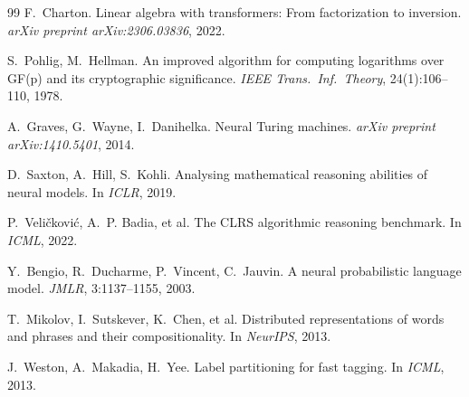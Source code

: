\documentclass[11pt]{article}
\begin{document}
\begin{thebibliography}{99}
F.~Charton.
\newblock Linear algebra with transformers: From factorization to inversion.
\newblock \emph{arXiv preprint arXiv:2306.03836}, 2022.

S.~Pohlig, M.~Hellman.
\newblock An improved algorithm for computing logarithms over GF(p) and its cryptographic significance.
\newblock \emph{IEEE Trans.\ Inf.\ Theory}, 24(1):106--110, 1978.

A.~Graves, G.~Wayne, I.~Danihelka.
\newblock Neural Turing machines.
\newblock \emph{arXiv preprint arXiv:1410.5401}, 2014.

D.~Saxton, A.~Hill, S.~Kohli.
\newblock Analysing mathematical reasoning abilities of neural models.
\newblock In \emph{ICLR}, 2019.

P.~Veli\v{c}kovi\'{c}, A.~P. Badia, et al.
\newblock The CLRS algorithmic reasoning benchmark.
\newblock In \emph{ICML}, 2022.

Y.~Bengio, R.~Ducharme, P.~Vincent, C.~Jauvin.
\newblock A neural probabilistic language model.
\newblock \emph{JMLR}, 3:1137--1155, 2003.

T.~Mikolov, I.~Sutskever, K.~Chen, et al.
\newblock Distributed representations of words and phrases and their compositionality.
\newblock In \emph{NeurIPS}, 2013.

J.~Weston, A.~Makadia, H.~Yee.
\newblock Label partitioning for fast tagging.
\newblock In \emph{ICML}, 2013.

\end{thebibliography}
\end{document}
